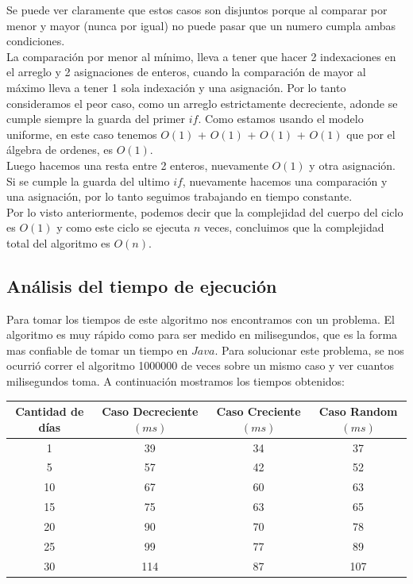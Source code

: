 \indent Se puede ver claramente que estos casos son disjuntos porque al comparar por menor y mayor (nunca por igual) no puede pasar que un numero cumpla ambas condiciones.\\
\indent La comparación por menor al mínimo, lleva a tener que hacer 2 indexaciones en el arreglo y 2 asignaciones de enteros, cuando la comparación de mayor al máximo lleva a tener 1 sola indexación y una asignación. Por lo tanto consideramos el peor caso, como un arreglo estrictamente decreciente, adonde se cumple siempre la guarda del primer $if$. Como estamos usando el modelo uniforme, en este caso tenemos $O(1)$ + $O(1)$ + $O(1)$ + $O(1)$ que por el álgebra de ordenes, es $O(1)$. \\                                                   
\indent Luego hacemos una resta entre 2 enteros, nuevamente $O(1)$ y otra asignación. Si se cumple la guarda del ultimo $if$, nuevamente hacemos una comparación y una asignación, por lo tanto seguimos trabajando en tiempo constante.\\
\indent Por lo visto anteriormente, podemos decir que la complejidad del cuerpo del ciclo es $O(1)$ y como este ciclo se ejecuta $n$ veces, concluimos que la complejidad total del algoritmo es $O(n)$.\\


\subsection{Análisis del tiempo de ejecución}

\indent Para tomar los tiempos de este algoritmo nos encontramos con un problema. El algoritmo es muy rápido como para ser medido en milisegundos, que es la forma mas confiable de tomar un tiempo en $Java$. Para solucionar este problema, se nos ocurrió correr el algoritmo 1000000 de veces sobre un mismo caso y ver cuantos milisegundos toma. A continuación mostramos los tiempos obtenidos:\\

\begin{center}
\begin{tabular}{|c|c|c|c|}
  \hline
  Cantidad de días & Caso Decreciente $(ms)$   & Caso Creciente $(ms)$ & Caso Random $(ms)$ \\
  \hline
  1        & 39            & 34         & 37        \\
  \hline
  5        & 57            & 42         & 52        \\
  \hline
  10        & 67           & 60        & 63       \\
  \hline
  15        & 75            & 63        & 65        \\
  \hline
  20  	   & 90          & 70      & 78        \\
  \hline
  25        & 99            & 77        & 89        \\
  \hline
  30	   & 114          & 87      & 107        \\
  \hline
\end{tabular}
\end{center}

